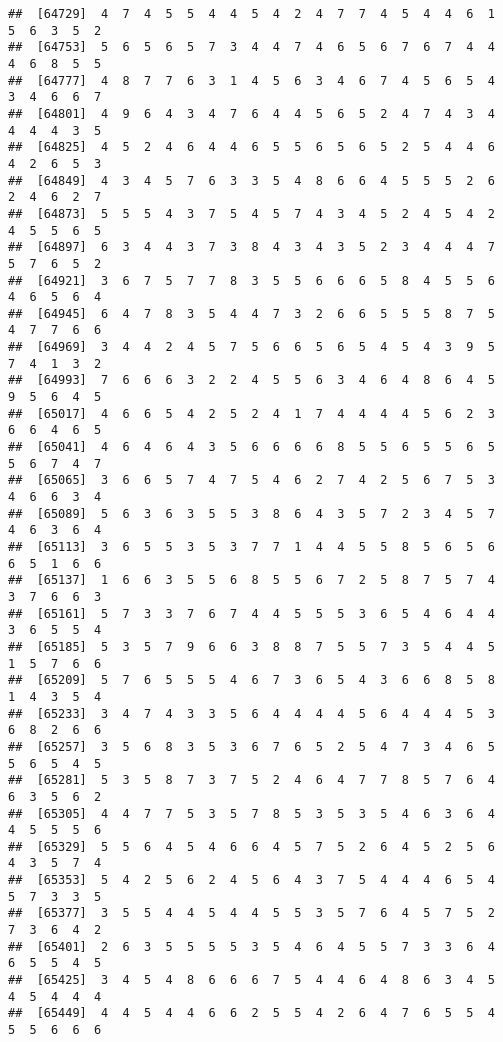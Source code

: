 \documentclass[
]{book}
\begin{document}
\begin{verbatim}
##  [64729]  4  7  4  5  5  4  4  5  4  2  4  7  7  4  5  4  4  6  1  5  6  3  5  2
##  [64753]  5  6  5  6  5  7  3  4  4  7  4  6  5  6  7  6  7  4  4  4  6  8  5  5
##  [64777]  4  8  7  7  6  3  1  4  5  6  3  4  6  7  4  5  6  5  4  3  4  6  6  7
##  [64801]  4  9  6  4  3  4  7  6  4  4  5  6  5  2  4  7  4  3  4  4  4  4  3  5
##  [64825]  4  5  2  4  6  4  4  6  5  5  6  5  6  5  2  5  4  4  6  4  2  6  5  3
##  [64849]  4  3  4  5  7  6  3  3  5  4  8  6  6  4  5  5  5  2  6  2  4  6  2  7
##  [64873]  5  5  5  4  3  7  5  4  5  7  4  3  4  5  2  4  5  4  2  4  5  5  6  5
##  [64897]  6  3  4  4  3  7  3  8  4  3  4  3  5  2  3  4  4  4  7  5  7  6  5  2
##  [64921]  3  6  7  5  7  7  8  3  5  5  6  6  6  5  8  4  5  5  6  4  6  5  6  4
##  [64945]  6  4  7  8  3  5  4  4  7  3  2  6  6  5  5  5  8  7  5  4  7  7  6  6
##  [64969]  3  4  4  2  4  5  7  5  6  6  5  6  5  4  5  4  3  9  5  7  4  1  3  2
##  [64993]  7  6  6  6  3  2  2  4  5  5  6  3  4  6  4  8  6  4  5  9  5  6  4  5
##  [65017]  4  6  6  5  4  2  5  2  4  1  7  4  4  4  4  5  6  2  3  6  6  4  6  5
##  [65041]  4  6  4  6  4  3  5  6  6  6  6  8  5  5  6  5  5  6  5  5  6  7  4  7
##  [65065]  3  6  6  5  7  4  7  5  4  6  2  7  4  2  5  6  7  5  3  4  6  6  3  4
##  [65089]  5  6  3  6  3  5  5  3  8  6  4  3  5  7  2  3  4  5  7  4  6  3  6  4
##  [65113]  3  6  5  5  3  5  3  7  7  1  4  4  5  5  8  5  6  5  6  6  5  1  6  6
##  [65137]  1  6  6  3  5  5  6  8  5  5  6  7  2  5  8  7  5  7  4  3  7  6  6  3
##  [65161]  5  7  3  3  7  6  7  4  4  5  5  5  3  6  5  4  6  4  4  3  6  5  5  4
##  [65185]  5  3  5  7  9  6  6  3  8  8  7  5  5  7  3  5  4  4  5  1  5  7  6  6
##  [65209]  5  7  6  5  5  5  4  6  7  3  6  5  4  3  6  6  8  5  8  1  4  3  5  4
##  [65233]  3  4  7  4  3  3  5  6  4  4  4  4  5  6  4  4  4  5  3  6  8  2  6  6
##  [65257]  3  5  6  8  3  5  3  6  7  6  5  2  5  4  7  3  4  6  5  5  6  5  4  5
##  [65281]  5  3  5  8  7  3  7  5  2  4  6  4  7  7  8  5  7  6  4  6  3  5  6  2
##  [65305]  4  4  7  7  5  3  5  7  8  5  3  5  3  5  4  6  3  6  4  4  5  5  5  6
##  [65329]  5  5  6  4  5  4  6  6  4  5  7  5  2  6  4  5  2  5  6  4  3  5  7  4
##  [65353]  5  4  2  5  6  2  4  5  6  4  3  7  5  4  4  4  6  5  4  5  7  3  3  5
##  [65377]  3  5  5  4  4  5  4  4  5  5  3  5  7  6  4  5  7  5  2  7  3  6  4  2
##  [65401]  2  6  3  5  5  5  5  3  5  4  6  4  5  5  7  3  3  6  4  6  5  5  4  5
##  [65425]  3  4  5  4  8  6  6  6  7  5  4  4  6  4  8  6  3  4  5  4  5  4  4  4
##  [65449]  4  4  5  4  4  6  6  2  5  5  4  2  6  4  7  6  5  5  4  5  5  6  6  6

\end{verbatim}
\end{document}
